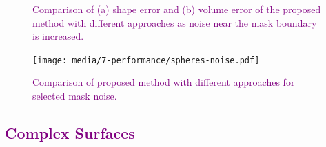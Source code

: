 \begin{figure}[b!]
	\centering
	\caption{\textcolor{purple}{Comparison of (a) shape error and (b) volume error of the proposed method with different approaches as noise near the mask boundary is increased.}}
	\label{fig:graph4}
\end{figure}
\begin{figure}[]
	\centering
	\texttt{[image: media/7-performance/spheres-noise.pdf]}
	\caption{\textcolor{purple}{Comparison of proposed method with different approaches for selected mask noise.}}
	\label{fig:demos4}
\end{figure}

\color{black}
\subsection{\textcolor{purple}{Complex Surfaces}}
\label{Complex Surfaces}

